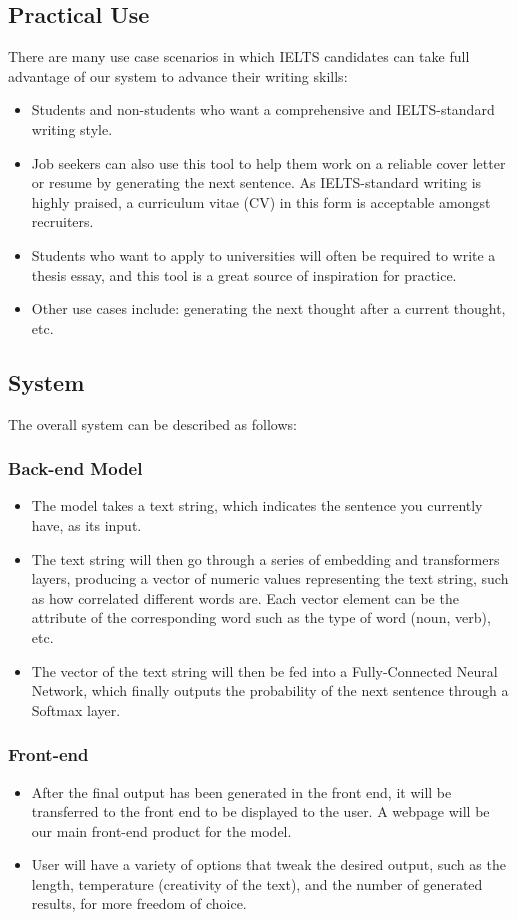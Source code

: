 \documentclass[conference]{IEEEtran}
\begin{document}
\subsection{Practical Use}
There are many use case scenarios in which IELTS candidates can take full advantage of our system to advance their writing skills:
\begin{itemize}
\item Students and non-students who want a comprehensive and IELTS-standard writing style.
\item Job seekers can also use this tool to help them work on a reliable cover letter or resume by generating the next sentence. As IELTS-standard writing is highly praised, a curriculum vitae (CV) in this form is acceptable amongst recruiters.
\item Students who want to apply to universities will often be required to write a thesis essay, and this tool is a great source of inspiration for practice.
\item Other use cases include: generating the next thought after a current thought, etc.
\end{itemize}

\subsection{System}
The overall system can be described as follows:\\
\subsubsection{Back-end Model}
\begin{itemize}
\item The model takes a text string, which indicates the sentence you currently have, as its input.
\item The text string will then go through a series of embedding and transformers layers, producing a vector of numeric values representing the text string, such as how correlated different words are. Each vector element can be the attribute of the corresponding word such as the type of word (noun, verb), etc.
\item The vector of the text string will then be fed into a Fully-Connected Neural Network, which finally outputs the probability of the next sentence through a Softmax layer.
\end{itemize}

\subsubsection{Front-end}
\begin{itemize}
\item After the final output has been generated in the front end, it will be transferred to the front end to be displayed to the user. A webpage will be our main front-end product for the model. 
\item User will have a variety of options that tweak the desired output, such as the length, temperature (creativity of the text), and the number of generated results, for more freedom of choice.
\end{itemize}
\end{document}
